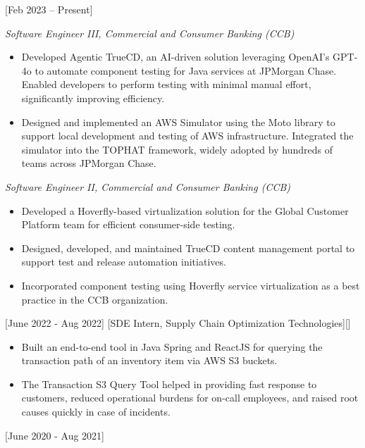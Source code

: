 \documentclass{article}
\begin{document}
[Feb 2023 -- Present]

\textit{Software Engineer III, Commercial and Consumer Banking (CCB)} \hfill 
\vspace{-2mm}
\begin{itemize}
  \item Developed Agentic TrueCD, an AI-driven solution leveraging OpenAI’s GPT-4o to automate component testing for Java services at JPMorgan Chase. Enabled developers to perform testing with minimal manual effort, significantly improving efficiency.
  \item Designed and implemented an AWS Simulator using the Moto library to support local development and testing of AWS infrastructure. Integrated the simulator into the TOPHAT framework, widely adopted by hundreds of teams across JPMorgan Chase.
\end{itemize}

\vspace{-1mm}
\textit{Software Engineer II, Commercial and Consumer Banking (CCB)}
\vspace{-2mm}
\begin{itemize}
  \item Developed a Hoverfly-based virtualization solution for the Global Customer Platform team for efficient consumer-side testing.
  \item Designed, developed, and maintained TrueCD content management portal to support test and release automation initiatives.
  \item Incorporated component testing using Hoverfly service virtualization as a best practice in the CCB organization.
\end{itemize}

[June 2022 - Aug 2022]
[SDE Intern, Supply Chain Optimization Technologies][]

\begin{itemize}
\item Built an end-to-end tool in Java Spring and ReactJS for querying the transaction path of an inventory item via AWS S3 buckets.
\item The Transaction S3 Query Tool helped in providing fast response to customers, reduced operational burdens for on-call employees, and raised root causes quickly in case of incidents.
\end{itemize}

[June 2020 - Aug 2021]
\end{document}
